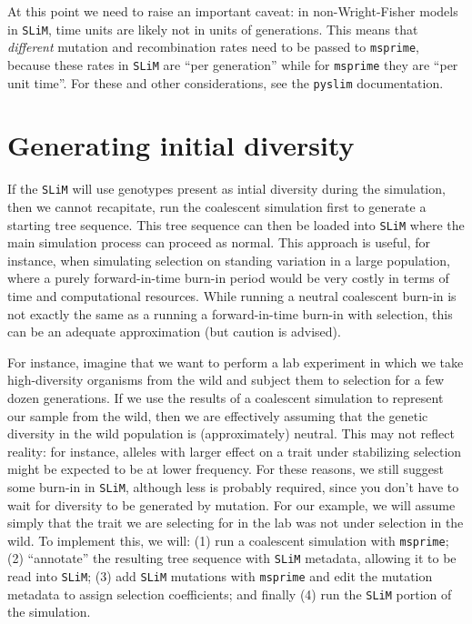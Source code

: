 \documentclass[12pt]{article}
\newcommand{\msprime}[0]{\texttt{msprime}\xspace}
\newcommand{\slim}[0]{\texttt{SLiM}\xspace}
\newcommand{\pyslim}[0]{\texttt{pyslim}\xspace}
\begin{document}
At this point we need to raise an important caveat:
in non-Wright-Fisher models in \slim,
time units are likely not in units of generations.
This means that \emph{different} mutation and recombination rates need to be passed to \msprime,
because these rates in \slim are ``per generation'' while for \msprime they are ``per unit time''.
For these and other considerations, see the \pyslim documentation.

\section{Generating initial diversity} %

If the \slim will use genotypes present as intial diversity during the simulation,
then we cannot recapitate,
run the coalescent simulation first to generate a starting tree sequence.
This tree sequence can then be loaded into \slim where the main simulation process can proceed as normal.
This approach is useful, for instance, when simulating selection on standing variation in a large population,
where a purely forward-in-time burn-in period would be very costly in terms of time and computational resources.
While running a neutral coalescent burn-in is not exactly the same as a running a forward-in-time burn-in with selection,
this can be an adequate approximation (but caution is advised).

For instance,
imagine that we want to perform a lab experiment in which we take high-diversity
organisms from the wild and subject them to selection for a few dozen generations.
If we use the results of a coalescent simulation to represent our sample from the wild,
then we are effectively assuming that the genetic diversity in the wild population is (approximately) neutral.
This may not reflect reality: for instance,
alleles with larger effect on a trait under stabilizing selection might be expected to be at lower frequency.
For these reasons, we still suggest some burn-in in \slim,
although less is probably required, since you don't have to wait for diversity to be generated by mutation.
For our example, we will assume simply that the trait we are selecting for in the lab was
not under selection in the wild. To implement this, we will:
(1) run a coalescent simulation with \msprime;
(2) ``annotate'' the resulting tree sequence with \slim metadata, allowing it to be read into \slim;
(3) add \slim mutations with \msprime
        and edit the mutation metadata to assign selection coefficients; and finally
(4) run the \slim portion of the simulation.
\end{document}
